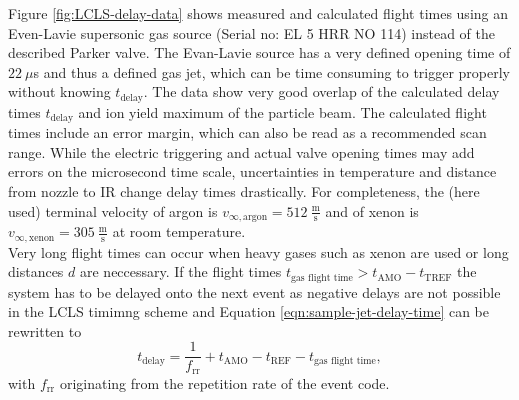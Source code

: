 Figure \ref{fig:LCLS-delay-data} shows measured and calculated flight times using an Even-Lavie supersonic gas source (Serial no: EL 5 HRR NO 114) instead of the described Parker valve. The Evan-Lavie source has a very defined opening time of $22~\mu$s and thus a defined gas jet, which can be time consuming to trigger properly without knowing $t_{\text{delay}}$. The data show very good overlap of the calculated delay times $t_{\text{delay}}$ and ion yield maximum of the particle beam. The calculated flight times include an error margin, which can also be read as a recommended scan range. While the electric triggering and actual valve opening times may add errors on the microsecond time scale, uncertainties in temperature and distance from nozzle to IR change delay times drastically. For completeness, the (here used) terminal velocity of argon is $v_{\infty,\text{argon}}=512~\frac{\text{m}}{\text{s}}$ and of xenon is $v_{\infty,\text{xenon}}=305~\frac{\text{m}}{\text{s}}$ at room temperature.\\
Very long flight times can occur when heavy gases such as xenon are used or long distances $d$ are neccessary. If the flight times $t_{\text{gas flight time}} > t_{\text{AMO}} - t_{\text{TREF}}$ the system has to be delayed onto the next event as negative delays are not possible in the LCLS timimng scheme and Equation \eqref{eqn:sample-jet-delay-time} can be rewritten to
\begin{equation}
t_{\text{delay}} = \frac{1}{f_{\text{rr}}}+ t_{\text{AMO}} - t_{\text{REF}} - t_{\text{gas flight time}},
\label{eqn:sample-jet-delay-time-next}
\end{equation}
with $f_{\text{rr}}$ originating from the repetition rate of the event code.
%
%
%
